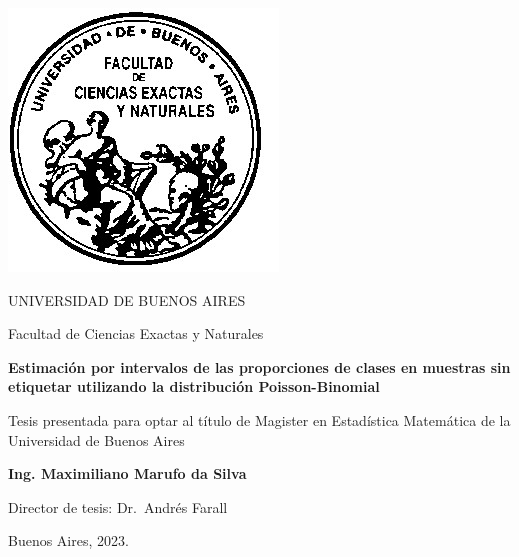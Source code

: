 \thispagestyle{empty}

\begin{center}
  \includegraphics[scale = 0.3]{logofac.jpg}
  
  \medskip
  UNIVERSIDAD DE BUENOS AIRES
  
  Facultad de Ciencias Exactas y Naturales
  
 
  
  \vspace{3cm}
  \textbf{\large Estimación por intervalos de las proporciones de clases en muestras sin etiquetar utilizando la distribución Poisson-Binomial}
  
  \vspace{2cm}
  Tesis presentada para optar al título de Magister en Estadística Matemática de
  la Universidad de Buenos Aires
  
  \vspace{2cm}
  \textbf{Ing. Maximiliano Marufo da Silva}
\end{center}


\vspace{1.5cm}
\noindent Director de tesis: Dr.~Andrés Farall
 

\vspace{1cm}
\noindent Buenos Aires,  2023.
